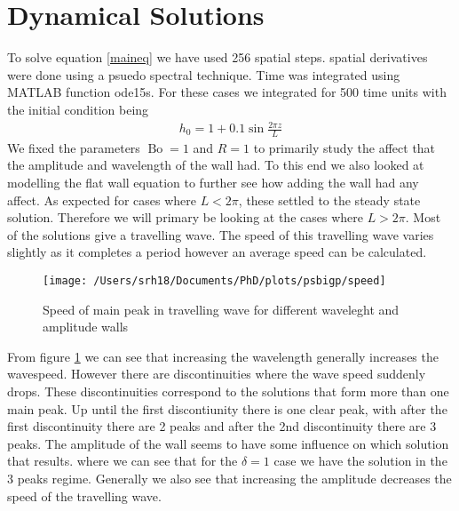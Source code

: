 \documentclass{jfm}
\DeclareMathOperator{\Bo}{Bo}
\begin{document}
\section{Dynamical Solutions}
To solve equation \eqref{maineq} we have used 256 spatial steps. spatial derivatives were done using a psuedo spectral technique. Time was integrated using MATLAB function ode15s. For these cases we integrated for 500 time units with the initial condition being 
\begin{align}
	h_0 = 1 + 0.1\sin\frac{2 \pi z}{L}
\end{align}
We fixed the parameters $\Bo = 1$ and $R = 1$ to primarily study the affect that the amplitude and wavelength of the wall had. To this end we also looked at modelling the flat wall equation to further see how adding the wall had any affect. As expected for cases where $L<2\pi$, these settled to the steady state solution. Therefore we will primary be looking at the cases where $L >2\pi$. 
Most of the solutions give a travelling wave. The speed of this travelling wave varies slightly as it completes a period however an average speed can be calculated.
\begin{figure}
\vspace{.25cm}
\centering
 \texttt{[image: /Users/srh18/Documents/PhD/plots/psbigp/speed]}
\caption{Speed of main peak in travelling wave for different waveleght and amplitude walls}
\label{speed}
\end{figure}
From figure \ref{speed} we can see that increasing the wavelength generally increases the wavespeed. However there are discontinuities where the wave speed suddenly drops. These discontinuities correspond to the solutions that form more than one main peak. Up until the first discontiunity there is one clear peak, with after the first discontinuity there are 2 peaks and after the 2nd discontinuity there are 3 peaks. The amplitude of the wall seems to have some influence on which solution that results. where we can see that for the $\delta = 1$ case we have the solution in the 3 peaks regime. Generally we also see that increasing the amplitude decreases the speed of the travelling wave. 
\end{document}
